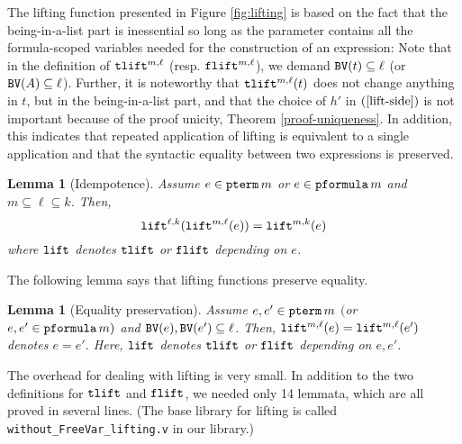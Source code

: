 \documentclass{svjour3}                     %
\newtheorem{lem}[thm]{Lemma}
\newcommand{\tm}{\subseteq}
\newcommand{\tpterm}{\textup{\tt pterm}}
\newcommand{\tpfml}{\textup{\tt pformula}}
\newcommand{\tPH}{\textup{\tt BV}}
\newcommand{\ttlift}{\textup{\tt tlift}}
\newcommand{\tflift}{\textup{\tt flift}}
\newcommand{\tlift}{\textup{\tt lift}}
\begin{document}
The lifting function presented in Figure \ref{fig:lifting} is based on the fact that the being-in-a-list part is inessential so long as the parameter contains all the formula-scoped variables needed for the construction of an expression: Note that in the definition of $\ttlift^{m,\ell}$ (resp. $\tflift^{m,\ell}$), we demand $\tPH(t) \tm \ell$ (or $\tPH(A) \tm \ell$). Further, it is noteworthy that $\ttlift^{m,\ell}(t)$ does not change anything in $t$, but in the being-in-a-list part, and that the choice of $h'$ in $(\ref{lift-side})$ is not important because of the proof unicity, Theorem \ref{proof-uniqueness}. In addition, this indicates that repeated application of lifting is equivalent to a single application and that the syntactic equality between two expressions is preserved.

\begin{lem}[Idempotence]
Assume $e\in \tpterm \, m$ or $e \in \tpfml \, m$ and $m\subseteq \ell\subseteq k$. Then,
\[
\tlift^{\ell,k}(\tlift^{m,\ell}(e))  =  \tlift^{m, k}(e)
\]
where $\tlift$ denotes $\ttlift$ or $\tflift$ depending on $e$.
\end{lem}

\noindent The following lemma says that lifting functions preserve equality.

\begin{lem}[Equality preservation]\label{eq-preservation}
  Assume $e, e' \in \tpterm\, m$ $($or $e, e' \in \tpfml\, m)$ and $\tPH(e), \tPH(e') \tm \ell$. Then, $\tlift^{m, \ell} (e) = \tlift^{m, \ell} (e')$ denotes $e =e'$. Here, $\tlift$ denotes $\ttlift$ or $\tflift$ depending on $e, e'$.
\end{lem}

The overhead for dealing with lifting is very small. In addition to the two definitions for $\ttlift$ and $\tflift$, we needed only 14 lemmata, which are all proved in several lines. (The base library for lifting is called \verb|without_FreeVar_lifting.v| in our library.)
\end{document}
